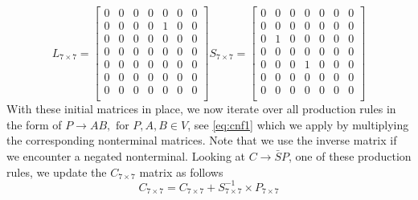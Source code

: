 \[
    L_{7\times 7} = 
    \begin{bmatrix}
        0 & 0 & 0 & 0 & 0 & 0 & 0 \\
        0 & 0 & 0 & 0 & 1 & 0 & 0 \\
        0 & 0 & 0 & 0 & 0 & 0 & 0 \\
        0 & 0 & 0 & 0 & 0 & 0 & 0 \\
        0 & 0 & 0 & 0 & 0 & 0 & 0 \\
        0 & 0 & 0 & 0 & 0 & 0 & 0 \\
        0 & 0 & 0 & 0 & 0 & 0 & 0 \\
    \end{bmatrix}
    S_{7\times 7} = 
    \begin{bmatrix}
        0 & 0 & 0 & 0 & 0 & 0 & 0 \\
        0 & 0 & 0 & 0 & 0 & 0 & 0 \\
        0 & 1 & 0 & 0 & 0 & 0 & 0 \\
        0 & 0 & 0 & 0 & 0 & 0 & 0 \\
        0 & 0 & 0 & 1 & 0 & 0 & 0 \\
        0 & 0 & 0 & 0 & 0 & 0 & 0 \\
        0 & 0 & 0 & 0 & 0 & 0 & 0 \\
    \end{bmatrix}
\]
With these initial matrices in place, we now iterate over all production rules in the form of $P\rightarrow AB, \textrm{ for } P,A,B \in V$, see \autoref{eq:cnf1} which we apply by multiplying the corresponding nonterminal matrices. Note that we use the inverse matrix if we encounter a negated nonterminal. Looking at $C\rightarrow \bar{S}P$, one of these production rules, we update the $C_{7\times 7}$ matrix as follows $$C_{7\times 7} = C_{7\times 7} + S_{7\times 7}^{-1} \times P_{7\times 7}$$

